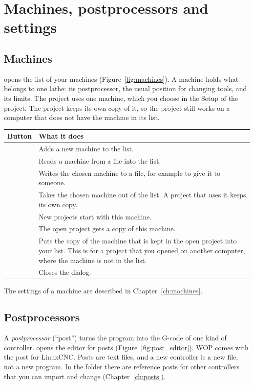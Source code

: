 \section{Machines, postprocessors and settings}

\subsection{Machines}
 opens the list of your machines (Figure~\ref{fig:machines}). A machine holds what belongs to one lathe: its postprocessor, the usual position for changing tools, and its limits. The project uses one machine, which you choose in the Setup of the project. The project keeps its own copy of it, so the project still works on a computer that does not have the machine in its list.

\begin{center}
\begin{tabularx}{\textwidth}{@{}l Y@{}}
\toprule
\textbf{Button} & \textbf{What it does} \\
\midrule
{} & Adds a new machine to the list. \\
 & Reads a machine from a file into the list. \\
 & Writes the chosen machine to a file, for example to give it to someone. \\
 & Takes the chosen machine out of the list. A project that uses it keeps its own copy. \\
 & New projects start with this machine. \\
 & The open project gets a copy of this machine. \\
 & Puts the copy of the machine that is kept in the open project into your list. This is for a project that you opened on another computer, where the machine is not in the list. \\
 & Closes the dialog. \\
\bottomrule
\end{tabularx}
\end{center}

The settings of a machine are described in Chapter~\ref{ch:machines}.

\subsection{Postprocessors}
A \emph{postprocessor} (``post'') turns the program into the G-code of one kind of controller.  opens the editor for posts (Figure~\ref{fig:post_editor}). WOP comes with the post for LinuxCNC. Posts are text files, and a new controller is a new file, not a new program. In the folder  there are reference posts for other controllers that you can import and change (Chapter~\ref{ch:posts}).

